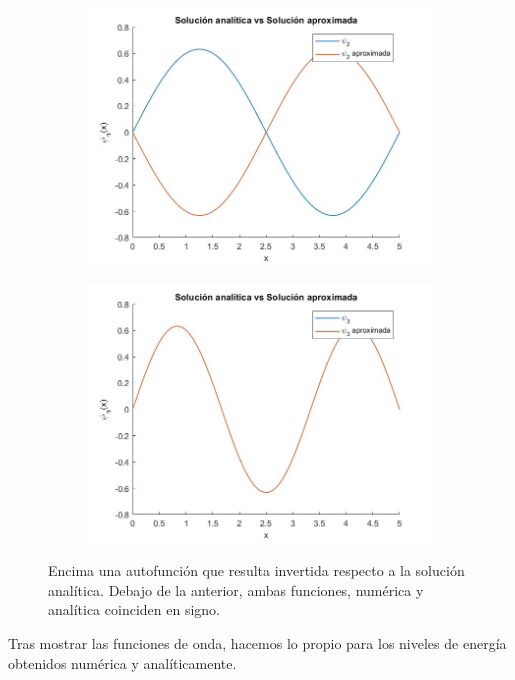 \documentclass[12pt]{article}
\begin{document}
\begin{figure}[H]
\centering
\begin{subfigure}{1\textwidth}
    \includegraphics[width=1\textwidth]{fotos/n2_infinit_vs.jpg}
\end{subfigure}
\hfill
\begin{subfigure}{1\textwidth}
    \includegraphics[width=1\textwidth]{fotos/n3_infinito_vs.jpg}
\end{subfigure}
\caption{Encima una autofunción que resulta invertida respecto a la solución analítica. Debajo de la anterior, ambas funciones, numérica y analítica coinciden en signo.}
\end{figure}

Tras mostrar las funciones de onda, hacemos lo propio para los niveles de energía obtenidos numérica y analíticamente.
\end{document}
